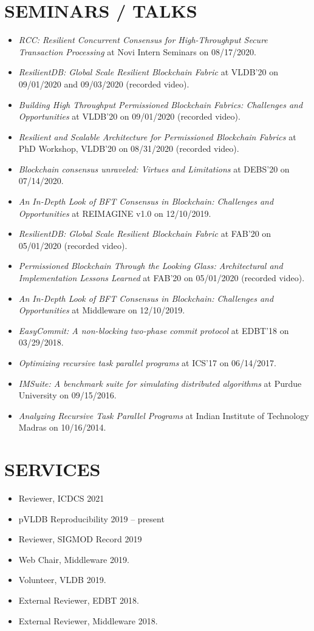 \documentclass[10pt]{article}
\begin{document}
\section*{SEMINARS / TALKS}
\begin{itemize}
\itemsep-0.2em
\item {\em RCC: Resilient Concurrent Consensus for High-Throughput Secure Transaction Processing} at Novi Intern Seminars on 08/17/2020.
\item {\em ResilientDB: Global Scale Resilient Blockchain Fabric} at VLDB'20 on 09/01/2020 and 09/03/2020 (recorded video).
\item {\em Building High Throughput Permissioned Blockchain Fabrics: Challenges and Opportunities} at VLDB'20 on 09/01/2020 (recorded video).
\item {\em Resilient and Scalable Architecture for Permissioned Blockchain Fabrics} at PhD Workshop, VLDB'20 on 08/31/2020 (recorded video).
\item {\em Blockchain consensus unraveled: Virtues and Limitations} at DEBS'20 on 07/14/2020.
\item {\em An In-Depth Look of BFT Consensus in Blockchain: Challenges and Opportunities} at REIMAGINE v1.0 on 12/10/2019.
\item {\em ResilientDB: Global Scale Resilient Blockchain Fabric} at FAB'20 on 05/01/2020 (recorded video).
\item {\em Permissioned Blockchain Through the Looking Glass: Architectural and Implementation Lessons Learned} at FAB'20 on 05/01/2020 (recorded video).
\item {\em An In-Depth Look of BFT Consensus in Blockchain: Challenges and Opportunities} at Middleware on 12/10/2019.
\item {\em EasyCommit: A non-blocking two-phase commit protocol} at EDBT'18 on 03/29/2018.
\item {\em Optimizing recursive task parallel programs} at ICS'17 on 06/14/2017.
\item {\em IMSuite: A benchmark suite for simulating distributed algorithms} at Purdue University on 09/15/2016.
\item {\em Analyzing Recursive Task Parallel Programs} at Indian Institute of Technology Madras on 10/16/2014.
\end{itemize}


\section*{SERVICES}
\begin{itemize}
\itemsep-0.2em
\item Reviewer, ICDCS 2021
\item pVLDB Reproducibility 2019 -- present
\item Reviewer, SIGMOD Record 2019
\item Web Chair, Middleware 2019.
\item Volunteer, VLDB 2019.
\item External Reviewer, EDBT 2018.
\item External Reviewer, Middleware 2018.
\end{itemize}
\end{document}
